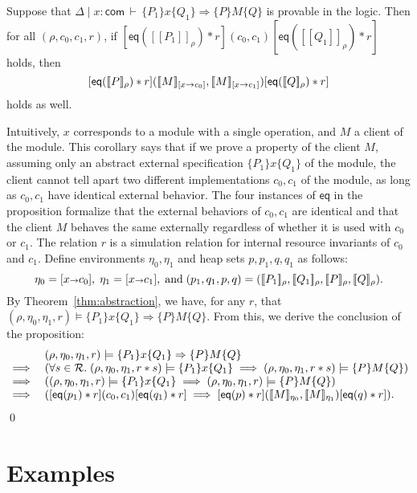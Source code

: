 \documentclass{LMCS}
\newcommand{\com}{\mathsf{com}}
\newcommand{\cR}{\mathcal{R}}
\newcommand{\bind}{{\scriptstyle\relax\rightarrow}}
\newcommand{\ff}[1]{[\![#1]\!]}
\newcommand{\mtri}[3]{\{{#1}\}{#2}\{{#3}\}}
\newcommand{\squad}[4]{{[{#1}]}
                        ({#2},  {#3})
                       {[{#4}]}}
\newcommand{\EQ}{\mathsf{eq}}
\begin{document}
\begin{cor}\label{cor:simple-abstraction}
Suppose that  $\Delta \mid x\colon \com \,\vdash\, 
     \mtri{P_1}{x}{Q_1} \Rightarrow \mtri{P}{M}{Q}$
is provable in the logic. Then for all 
$(\rho,c_0,c_1,r)$,
if \/ $\squad{\EQ(\ff{P_1}_\rho)*r}{c_0}{c_1}{\EQ(\ff{Q_1}_\rho) * r}$
holds, then
$$
\squad
     {\EQ(\ff{P}_\rho)*r}
     {\ff{M}_{[x\bind c_0]}}
     {\ff{M}_{[x\bind c_1]}}
     {\EQ(\ff{Q}_\rho) * r}
$$ 
holds as well.
\end{cor}
Intuitively, $x$ corresponds to a module with a single 
operation, and $M$ a client of the module. This corollary
says that if we prove a property of the client $M$, assuming
only an abstract external specification $\mtri{P_1}{x}{Q_1}$ of
the module, the client cannot tell apart two different 
implementations $c_0,c_1$ of the module, as long as
$c_0,c_1$ have identical external behavior. The 
four instances of $\EQ$ in the proposition formalize that
the external behaviors of $c_0,c_1$ are identical
and that the client $M$ behaves the same externally
regardless of whether it is used with $c_0$ or $c_1$. 
The relation $r$ is a simulation relation for
internal resource invariants of $c_0$ and $c_1$.
Define environments $\eta_0,\eta_1$ and heap sets $p,p_1,q,q_1$ as follows:
$$
\eta_0 = [x\bind c_0],\; \eta_1 = [x\bind c_1],\;\mbox{and}\;
(p_1,q_1,p,q) = (\ff{P_1}_\rho,\ff{Q_1}_\rho,\ff{P}_\rho,\ff{Q}_\rho).
$$
By Theorem~\ref{thm:abstraction}, we have, for any $r$, that
$
   (\rho,\eta_0,\eta_1,r) \models \mtri{P_1}{x}{Q_1} \Rightarrow \mtri{P}{M}{Q}.
$
From this, we derive the conclusion of the proposition:
$$
\begin{array}{@{}cl@{}}
& (\rho,\eta_0,\eta_1,r) \models \mtri{P_1}{x}{Q_1} \Rightarrow \mtri{P}{M}{Q}
\\
{\implies} 
& (\forall s \in \cR.\;
   (\rho,\eta_0,\eta_1,r*s) \models \mtri{P_1}{x}{Q_1} \implies
   (\rho,\eta_0,\eta_1,r*s) \models \mtri{P}{M}{Q}) 
\\
{\implies} 
& ((\rho,\eta_0,\eta_1,r) \models \mtri{P_1}{x}{Q_1} \implies
   (\rho,\eta_0,\eta_1,r) \models \mtri{P}{M}{Q}) 
\\
{\implies} 
& (\squad{\EQ(p_1)*r}{c_0}{c_1}{\EQ(q_1)*r} \implies
   \squad{\EQ(p)*r}{\ff{M}_{\eta_0}}{\ff{M}_{\eta_1}}{\EQ(q)*r}).
\end{array} 
$$
\qed

\section{Examples}
\label{sec:examples}
\end{document}
